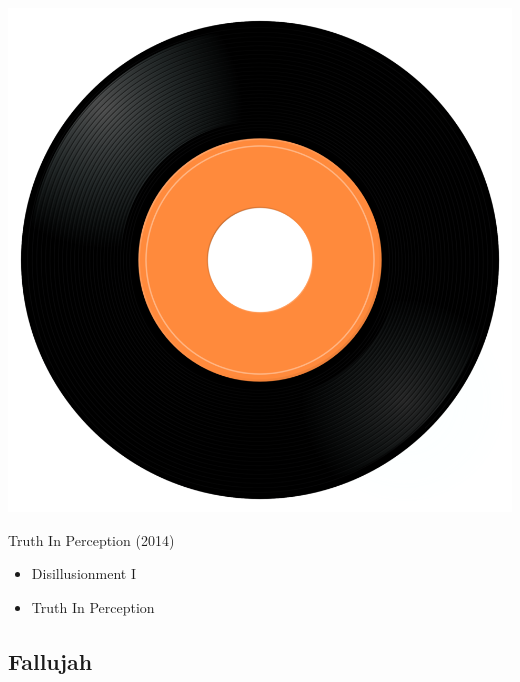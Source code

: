\begin{minipage}[t]{0.25\textwidth}\vspace{0pt}
\captionsetup{type=figure}
\includegraphics[width=\textwidth]{Images/cover.png}
\caption*{Truth In Perception (2014)}
\end{minipage}
\begin{minipage}[t]{0.25\textwidth}\vspace{0pt}
\begin{itemize}[nosep,leftmargin=1em,labelwidth=*,align=left]
	\setlength{\itemsep}{0pt}
	\item Disillusionment I
	\item Truth In Perception
\end{itemize}
\end{minipage}

\subsection{Fallujah}

